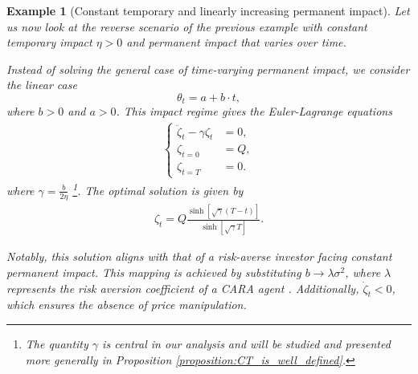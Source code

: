\documentclass[final,3p,authoryear,12pt]{elsarticle}
\newtheorem{example}{Example}
\begin{document}
\begin{example}[Constant temporary and linearly increasing permanent impact]

Let us now look at the reverse scenario of the previous example with constant temporary impact $\eta > 0$ and permanent impact that varies over time. %

Instead of solving the general case of time-varying permanent impact, we consider the linear case
\begin{equation}
\theta_t=a+b\cdot t,
\label{eq:linearlyvaryingimpact}
\end{equation}
where $b>0$ and $a>0$. This impact regime gives the %
Euler-Lagrange equations
\begin{align}
    \begin{cases}
        \ddot \zeta_{t} - \gamma\zeta_{t}&=0,\\
        \zeta_{t=0}&=Q,\\
    \zeta_{t=T}&=0.
    \end{cases}
\end{align}
where $\gamma =\frac{b}{2\eta}$ \footnote{The quantity \(\gamma\) is central in our analysis and will be studied and presented more generally in Proposition \ref{proposition:CT_is_well_defined}.}. The optimal solution is given by
\begin{eqnarray}
\zeta_t=Q \frac{\sinh [\sqrt{\gamma} (T-t)]}{\sinh[\sqrt{\gamma} T]}.
\end{eqnarray}

Notably, this solution aligns with that of a risk-averse investor facing constant permanent impact. This mapping is achieved by substituting $b \to \lambda \sigma^2$, where $\lambda$ represents the risk aversion coefficient of a CARA agent \cite{gueant2016financial}. Additionally, $ \dot \zeta_{t}<0$, which ensures the absence of price manipulation.
\label{example:tempconstantandincreasingpermanent}
\end{example}
\end{document}
